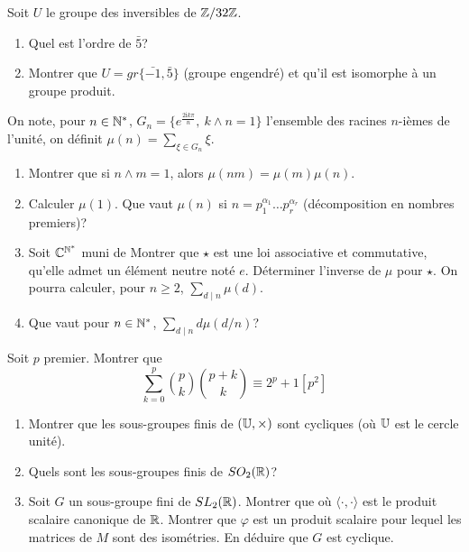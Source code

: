 \begin{exercise}
	Soit $U$ le groupe des inversibles de $\mathbb{Z}/32\mathbb{Z}$.
	\begin{enumerate}
		\item
		Quel est l'ordre de $\bar{5}$?
		\item
		Montrer que $U=gr\{\bar{-1},\bar{5}\}$ (groupe engendré) et qu'il est
		isomorphe à un groupe produit.
	\end{enumerate}
\end{exercise}

\begin{exercise}
	On note, pour $n\in\mathbb{N}^{*}$, $G_{n}=\{e^{\frac{2\mathrm{i}k\pi}{n}},~k\wedge
	n=1\}$ l'ensemble des racines $n$-ièmes de l'unité, on définit
	$\mu(n)=\sum_{\xi\in G_{n}}\xi$.
	\begin{enumerate}
		\item
		Montrer que si $n\wedge m=1$, alors $\mu(nm)=\mu(m)\mu(n)$.
		\item
		Calculer $\mu(1)$. Que vaut $\mu(n)$ si $n=p_{1}^{\alpha_{1}}\dots
		p_{r}^{\alpha_{r}}$ (décomposition en nombres premiers)?
		\item
		Soit $\mathbb{C}^{\mathbb{N}^{*}}$ muni de  Montrer que $\star$ est une loi
		associative et commutative, qu'elle admet un élément neutre noté $e$.
		Déterminer l'inverse de $\mu$ pour $\star$. On pourra calculer, pour
		$n\geqslant2$, $\sum_{d\mid n}\mu(d)$.
		\item
		Que vaut pour $n\in\mathbb{N}^{*}$, $\sum_{d\mid n}d\mu(d/n)$?
	\end{enumerate}
\end{exercise}

\begin{exercise}
	Soit $p$ premier. Montrer que
	$$\sum_{k=0}^{p}\binom{p}{k}\binom{p+k}{k}\equiv 2^{p}+1[p^{2}]$$
\end{exercise}

\begin{exercise}
	\phantom{}
	\begin{enumerate}
		\item
		Montrer que les sous-groupes finis de $(\mathbb{U},\times)$ sont cycliques (où
		$\mathbb{U}$ est le cercle unité).
		\item
		Quels sont les sous-groupes finis de $SO_{2}(\mathbb{R})$?
		\item
		Soit $G$ un sous-groupe fini de $SL_{2}(\mathbb{R})$. Montrer que
		 où
		$\langle\cdot,\cdot\rangle$ est le produit scalaire canonique de $\mathbb{R}$.
		Montrer que $\varphi$ est un produit scalaire pour lequel les matrices de
		$M$ sont des isométries. En déduire que $G$ est cyclique.
	\end{enumerate}
\end{exercise}

